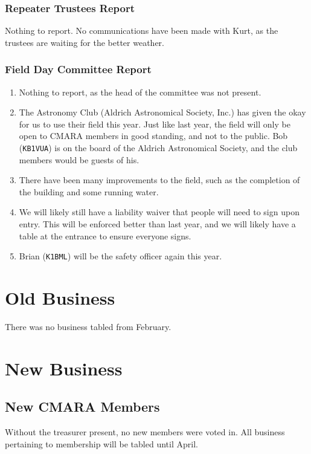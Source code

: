 \documentclass[10pt,letterpaper]{article}
\begin{document}
\subsubsection{Repeater Trustees Report}
Nothing to report. No communications have been made with Kurt, as the trustees are waiting for the better weather.

\subsubsection{Field Day Committee Report}
\begin{enumerate}
  \item Nothing to report, as the head of the committee was not present.
  \item The Astronomy Club (Aldrich Astronomical Society, Inc.) has given the okay for us to use their field this year. Just like last year, the field will only be open to CMARA members in good standing, and not to the public. Bob (\texttt{KB1VUA}) is on the board of the Aldrich Astronomical Society, and the club members would be guests of his.
  \item There have been many improvements to the field, such as the completion of the building and some running water.
  \item We will likely still have a liability waiver that people will need to sign upon entry. This will be enforced better than last year, and we will likely have a table at the entrance to ensure everyone signs.
  \item Brian (\texttt{K1BML}) will be the safety officer again this year.
\end{enumerate}

\section{Old Business}
There was no business tabled from February.

\section{New Business}

\subsection{New CMARA Members}
\label{new-cmara-members}

Without the treasurer present, no new members were voted in. All business pertaining to membership will be tabled until April.
\end{document}
